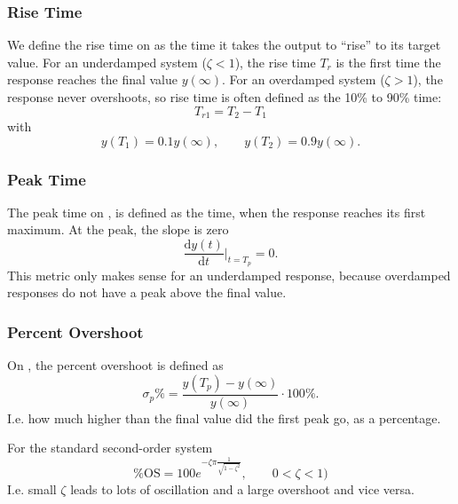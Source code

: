 \subsubsection{Rise Time}
We define the rise time on  as the time it takes the output to ``rise'' to its target value.
For an underdamped system ($\zeta < 1$), the rise time $T_r$ is the first time the response reaches the final value $y(\infty)$.
For an overdamped system ($\zeta > 1$), the response never overshoots, so rise time is often defined as the 10\% to 90\% time:
\begin{equation*}
  T_{r1} = T_2 - T_1
\end{equation*}
with
\begin{equation*}
  y(T_1) = \num{0,1}  y(\infty) , \qquad y(T_2) = \num{0,9} y(\infty)
.\end{equation*}

\subsubsection{Peak Time}
The peak time on , is defined as the time, when the response reaches its first maximum.
At the peak, the slope is zero
\begin{equation*}
  \frac{\mathrm{d}y(t)}{\mathrm{d}t} \Bigg|_{t = T_p} = 0
.\end{equation*}
This metric only makes sense for an underdamped response, because overdamped responses do not have a peak above the final value.


\subsubsection{Percent Overshoot}
On , the percent overshoot is defined as
\begin{equation*}
  \sigma_p \% = \frac{y(T_p) - y(\infty)}{y(\infty)} \cdot 100 \%
.\end{equation*}
I.e. how much higher than the final value did the first peak go, as a percentage.

For the standard second-order system
\begin{equation*}
  \% \mathrm{OS} = 100 e^{-\zeta \pi\frac{1}{\sqrt{1  - \zeta^2}}}, \qquad 0 < \zeta< 1)
\end{equation*}
I.e. small $\zeta$ leads to lots of oscillation and a large overshoot and vice versa.

